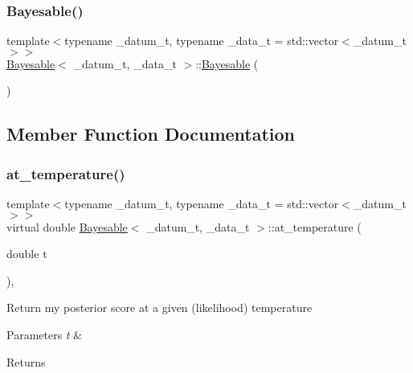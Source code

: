 \subsubsection{\texorpdfstring{Bayesable()}{Bayesable()}}
{\footnotesize\ttfamily template$<$typename \+\_\+datum\+\_\+t, typename \+\_\+data\+\_\+t = std\+::vector$<$\+\_\+datum\+\_\+t$>$$>$ \\
\hyperlink{class_bayesable}{Bayesable}$<$ \+\_\+datum\+\_\+t, \+\_\+data\+\_\+t $>$\+::\hyperlink{class_bayesable}{Bayesable} (\begin{DoxyParamCaption}{ }\end{DoxyParamCaption})\hspace{0.3cm}{\ttfamily [inline]}}



\subsection{Member Function Documentation}
\mbox{\label{class_bayesable_acf805473a9eea0df96d6267dca0e9c87}} 
\subsubsection{\texorpdfstring{at\+\_\+temperature()}{at\_temperature()}}
{\footnotesize\ttfamily template$<$typename \+\_\+datum\+\_\+t, typename \+\_\+data\+\_\+t = std\+::vector$<$\+\_\+datum\+\_\+t$>$$>$ \\
virtual double \hyperlink{class_bayesable}{Bayesable}$<$ \+\_\+datum\+\_\+t, \+\_\+data\+\_\+t $>$\+::at\+\_\+temperature (\begin{DoxyParamCaption}\item[{double}]{t }\end{DoxyParamCaption})\hspace{0.3cm}{\ttfamily [inline]}, {\ttfamily [virtual]}}

Return my posterior score at a given (likelihood) temperature 
\begin{DoxyParams}{Parameters}
{\em t} & \\
\hline
\end{DoxyParams}
\begin{DoxyReturn}{Returns}

\end{DoxyReturn}
\mbox{\label{class_bayesable_ac8ab4bb38c8782d2dcd57f3a43a3c605}} 
